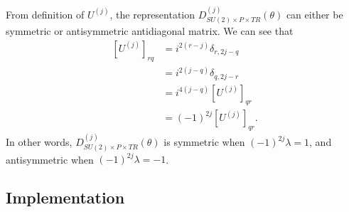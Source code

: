\documentclass[preprint, 12pt]{revtex4-2}
\numberwithin{equation}{section}
\begin{document}
From definition of $U^{(j)}$, the representation $D_{SU(2)\times P\times TR}^{(j)}(\theta)$ can either be symmetric or antisymmetric antidiagonal matrix. We can see that
\begin{equation}
    \begin{aligned}
        \left[U^{(j)}\right]_{rq} &= i^{2(r-j)}\delta_{r,2j-q} \\
        &= i^{2(j-q)}\delta_{q,2j-r} \\
        &= i^{4(j-q)}\left[U^{(j)}\right]_{qr} \\
        &= (-1)^{2j}\left[U^{(j)}\right]_{qr}.
    \end{aligned}
\end{equation}
In other words, $D_{SU(2)\times P\times TR}^{(j)}(\theta)$ is symmetric when $(-1)^{2j}\lambda = 1$, and antisymmetric when $(-1)^{2j}\lambda = -1$. 

\subsection{Implementation}
\end{document}
